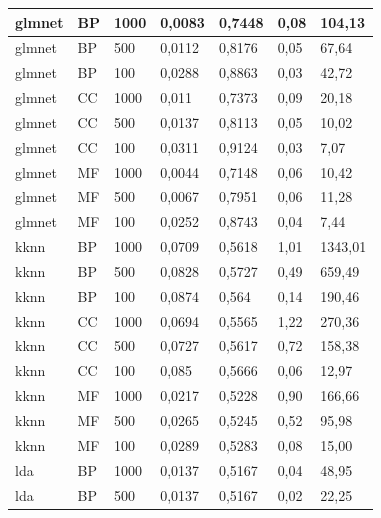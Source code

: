\documentclass[12pt]{report}
\begin{document}
\begin{appendices}
\begin{longtable}[h]{|l|l|l|l|l|l|l|}
glmnet       & BP   & 1000    & 0,0083 & 0,7448 & 0,08            & 104,13      \\ \hline
glmnet       & BP   & 500     & 0,0112 & 0,8176 & 0,05            & 67,64       \\ \hline
glmnet       & BP   & 100     & 0,0288 & 0,8863 & 0,03            & 42,72       \\ \hline
glmnet       & CC   & 1000    & 0,011  & 0,7373 & 0,09            & 20,18       \\ \hline
glmnet       & CC   & 500     & 0,0137 & 0,8113 & 0,05            & 10,02       \\ \hline
glmnet       & CC   & 100     & 0,0311 & 0,9124 & 0,03            & 7,07        \\ \hline
glmnet       & MF   & 1000    & 0,0044 & 0,7148 & 0,06            & 10,42       \\ \hline
glmnet       & MF   & 500     & 0,0067 & 0,7951 & 0,06            & 11,28       \\ \hline
glmnet       & MF   & 100     & 0,0252 & 0,8743 & 0,04            & 7,44        \\ \hline
kknn         & BP   & 1000    & 0,0709 & 0,5618 & 1,01            & 1343,01     \\ \hline
kknn         & BP   & 500     & 0,0828 & 0,5727 & 0,49            & 659,49      \\ \hline
kknn         & BP   & 100     & 0,0874 & 0,564  & 0,14            & 190,46      \\ \hline
kknn         & CC   & 1000    & 0,0694 & 0,5565 & 1,22            & 270,36      \\ \hline
kknn         & CC   & 500     & 0,0727 & 0,5617 & 0,72            & 158,38      \\ \hline
kknn         & CC   & 100     & 0,085  & 0,5666 & 0,06            & 12,97       \\ \hline
kknn         & MF   & 1000    & 0,0217 & 0,5228 & 0,90            & 166,66      \\ \hline
kknn         & MF   & 500     & 0,0265 & 0,5245 & 0,52            & 95,98       \\ \hline
kknn         & MF   & 100     & 0,0289 & 0,5283 & 0,08            & 15,00       \\ \hline
lda          & BP   & 1000    & 0,0137 & 0,5167 & 0,04            & 48,95       \\ \hline
lda          & BP   & 500     & 0,0137 & 0,5167 & 0,02            & 22,25       \\ \hline

\end{longtable}
\end{appendices}
\end{document}

